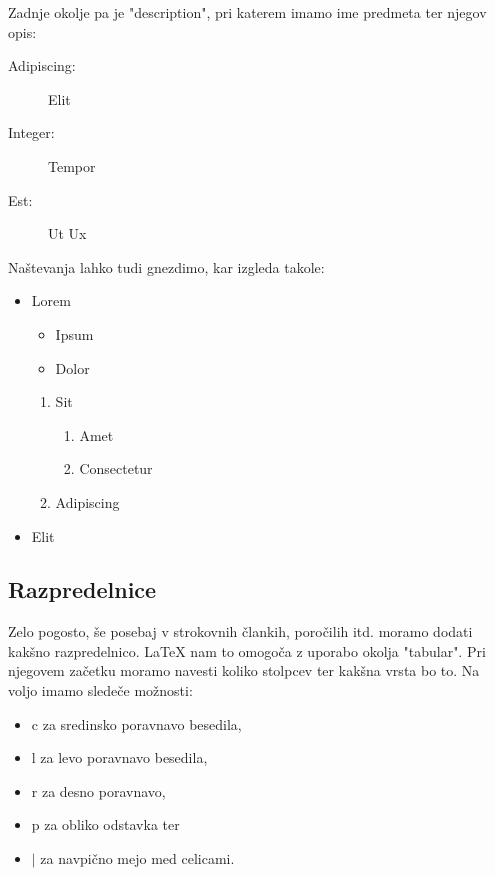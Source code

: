 \documentclass[a4paper]{book}
\begin{document}
Zadnje okolje pa je "description", pri katerem imamo ime predmeta ter njegov opis:
\begin{description}
\item[Adipiscing:] Elit
\item[Integer:] Tempor
\item[Est:] Ut Ux
\end{description}

Naštevanja lahko tudi gnezdimo, kar izgleda takole:

\begin{itemize}
  \item Lorem
  \begin{itemize}
    \item Ipsum
    \item Dolor
  \end{itemize}
  \begin{enumerate}
    \item Sit
    \begin{enumerate}
      \item Amet
      \item Consectetur
    \end{enumerate}
    \item Adipiscing
  \end{enumerate}
  \item Elit
\end{itemize}

\subsection{Razpredelnice}

Zelo pogosto, še posebaj v strokovnih člankih, poročilih itd. moramo dodati kakšno razpredelnico. \LaTeX{} nam to omogoča z uporabo okolja "tabular".
Pri njegovem začetku moramo navesti koliko stolpcev ter kakšna vrsta bo to. Na voljo imamo sledeče možnosti:
\begin{itemize}
\item c za sredinsko poravnavo besedila,
\item l za levo poravnavo besedila,
\item r za desno poravnavo,
\item p za obliko odstavka ter
\item $|$ za navpično mejo med celicami.
\end{itemize}
\end{document}
